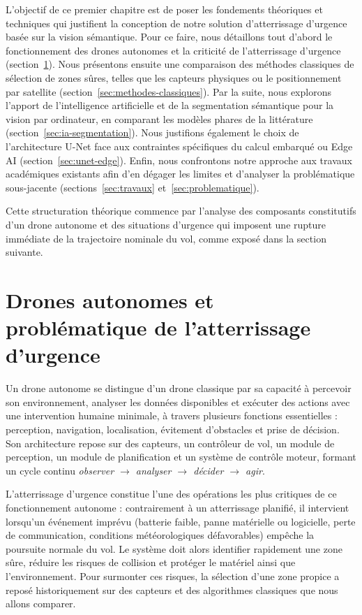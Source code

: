 L'objectif de ce premier chapitre est de poser les fondements théoriques et techniques qui justifient la conception de notre solution d'atterrissage d'urgence basée sur la vision sémantique. Pour ce faire, nous détaillons tout d'abord le fonctionnement des drones autonomes et la criticité de l'atterrissage d'urgence (section~\ref{sec:drones}). Nous présentons ensuite une comparaison des méthodes classiques de sélection de zones sûres, telles que les capteurs physiques ou le positionnement par satellite (section~\ref{sec:methodes-classiques}). Par la suite, nous explorons l'apport de l'intelligence artificielle et de la segmentation sémantique pour la vision par ordinateur, en comparant les modèles phares de la littérature (section~\ref{sec:ia-segmentation}). Nous justifions également le choix de l'architecture U-Net face aux contraintes spécifiques du calcul embarqué ou Edge AI (section~\ref{sec:unet-edge}). Enfin, nous confrontons notre approche aux travaux académiques existants afin d'en dégager les limites et d'analyser la problématique sous-jacente (sections~\ref{sec:travaux} et~\ref{sec:problematique}). 

Cette structuration théorique commence par l'analyse des composants constitutifs d'un drone autonome et des situations d'urgence qui imposent une rupture immédiate de la trajectoire nominale du vol, comme exposé dans la section suivante.


\section{Drones autonomes et problématique de l'atterrissage d'urgence}
\label{sec:drones}

Un drone autonome se distingue d'un drone classique par sa capacité à percevoir son environnement, analyser les données disponibles et exécuter des actions avec une intervention humaine minimale, à travers plusieurs fonctions essentielles : perception, navigation, localisation, évitement d'obstacles et prise de décision. Son architecture repose sur des capteurs, un contrôleur de vol, un module de perception, un module de planification et un système de contrôle moteur, formant un cycle continu \textit{observer $\rightarrow$ analyser $\rightarrow$ décider $\rightarrow$ agir}.

L'atterrissage d'urgence constitue l'une des opérations les plus critiques de ce fonctionnement autonome : contrairement à un atterrissage planifié, il intervient lorsqu'un événement imprévu (batterie faible, panne matérielle ou logicielle, perte de communication, conditions météorologiques défavorables) empêche la poursuite normale du vol. Le système doit alors identifier rapidement une zone sûre, réduire les risques de collision et protéger le matériel ainsi que l'environnement. Pour surmonter ces risques, la sélection d'une zone propice a reposé historiquement sur des capteurs et des algorithmes classiques que nous allons comparer.

